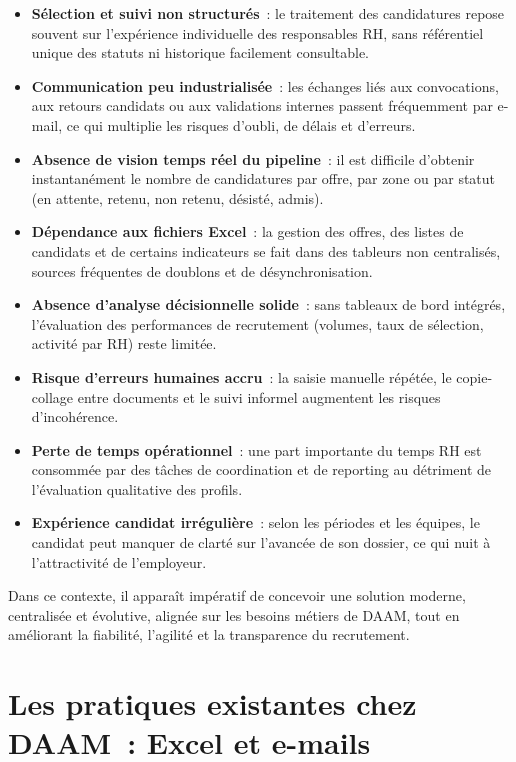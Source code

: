 \begin{itemize}
  \item \textbf{Sélection et suivi non structurés}~: le traitement des
        candidatures repose souvent sur l'expérience individuelle des
        responsables RH, sans référentiel unique des statuts ni historique
        facilement consultable.
  \item \textbf{Communication peu industrialisée}~: les échanges liés aux
        convocations, aux retours candidats ou aux validations internes
        passent fréquemment par e-mail, ce qui multiplie les risques d'oubli,
        de délais et d'erreurs.
  \item \textbf{Absence de vision temps réel du pipeline}~: il est difficile
        d'obtenir instantanément le nombre de candidatures par offre, par
        zone ou par statut (en attente, retenu, non retenu, désisté, admis).
  \item \textbf{Dépendance aux fichiers Excel}~: la gestion des offres, des
        listes de candidats et de certains indicateurs se fait dans des
        tableurs non centralisés, sources fréquentes de doublons et de
        désynchronisation.
  \item \textbf{Absence d'analyse décisionnelle solide}~: sans tableaux de
        bord intégrés, l'évaluation des performances de recrutement
        (volumes, taux de sélection, activité par RH) reste limitée.
  \item \textbf{Risque d'erreurs humaines accru}~: la saisie manuelle
        répétée, le copie-collage entre documents et le suivi informel
        augmentent les risques d'incohérence.
  \item \textbf{Perte de temps opérationnel}~: une part importante du temps
        RH est consommée par des tâches de coordination et de reporting au
        détriment de l'évaluation qualitative des profils.
  \item \textbf{Expérience candidat irrégulière}~: selon les périodes et les
        équipes, le candidat peut manquer de clarté sur l'avancée de son
        dossier, ce qui nuit à l'attractivité de l'employeur.
\end{itemize}

Dans ce contexte, il apparaît impératif de concevoir une solution moderne,
centralisée et évolutive, alignée sur les besoins métiers de DAAM, tout en
améliorant la fiabilité, l'agilité et la transparence du recrutement.


\section{Les pratiques existantes chez DAAM~: Excel et e-mails}

